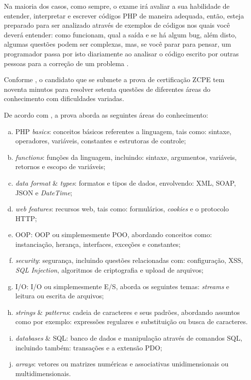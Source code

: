 Na maioria dos casos, como sempre, o exame irá avaliar a sua habilidade de
entender, interpretar e escrever códigos \acs{PHP} de maneira adequada, então,
esteja preparado para ser analizado através de exemplos de códigos nos quais
você deverá entender: como funcionam, qual a saída e se há algum \acs{bug},
além disto, algumas questões podem ser complexas, mas, se você parar para
pensar, um programador passa por isto diariamente ao analisar o código escrito
por outras pessoas para a correção de um problema
\cite{theZendPHPCertificationPracticeTestBook}.

Conforme , o candidato que
se submete a prova de certificação \acs{ZCPE} tem noventa minutos para resolver 
setenta questões de diferentes áreas do conhecimento com dificuldades variadas.

De acordo com , a prova aborda as seguintes áreas do
conhecimento:

\begin{enumerate}[a)]
    \item \acs{PHP} \textit{basics}: conceitos básicos referentes a
    linguagem, tais como: sintaxe, operadores, variáveis, constantes e
    estrutoras de controle;
    \item \textit{functions}: funções da linguagem, incluindo: sintaxe,
    argumentos, variáveis, retornos e escopo de variáveis;
    \item \textit{data format} \& \textit{types}: formatos e tipos de
    dados, envolvendo: \ac{XML}, \ac{SOAP}, \ac{JSON} e \textit{DateTime};
    \item \textit{web features}: recursos web, tais como: formulários,
    \textit{cookies} e o protocolo \ac{HTTP};
    \item \acs{OOP}: \acl{OOP} ou simplemesmente \ac{POO},
    abordando conceitos como: instanciação, herança, interfaces, exceções e
    constantes;
    \item \textit{security}: segurança, incluindo questões relacionadas com:
    configuração, \ac{XSS}, \textit{\acs{SQL} Injection},
    algoritmos de criptografia e upload de arquivos;
    \item \acs{I/O}: \acl{I/O} ou simplemesmente \ac{E/S}, aborda os seguintes
    temas: \textit{streams} e leitura ou escrita de arquivos;
    \item \textit{strings} \& \textit{patterns}: cadeia de caracteres e
    seus padrões, abordando assuntos como por exemplo: expressões
    regulares e substituição ou busca de caracteres.
    \item \textit{databases} \& \acs{SQL}: banco de dados e
    manipulação através de comandos \ac{SQL}, incluindo também: transações e a
    extensão \ac{PDO};
    \item \textit{arrays}: vetores ou matrizes numéricas e 
    associativas unidimensionais ou multidimensionais.
\end{enumerate}

